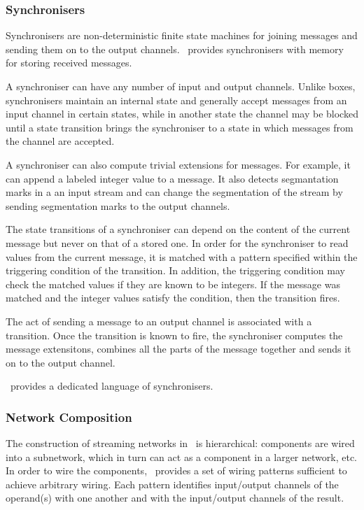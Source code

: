     \subsubsection{Synchronisers}
Synchronisers are non-deterministic finite state machines for joining messages and sending them on to the output channels. \ak\ provides synchronisers with memory for storing received messages.

A synchroniser can have any number of input and output channels. Unlike boxes, synchronisers maintain an internal state and generally accept messages from an input channel in certain states, while in another state the channel may be blocked until a state transition brings the synchroniser to a state in which messages from the channel are accepted.

A synchroniser can also compute trivial extensions for messages. For example, it can append a labeled integer value to a message. It also detects segmantation marks in a an input stream and can change the segmentation of the stream by sending segmentation marks to the output channels.

The state transitions of a synchroniser can depend on the content of the current message but never on that of a stored one. In order for the synchroniser to read values from the current message, it is matched with a pattern specified within the triggering condition of the transition. In addition, the triggering condition may check the matched values if they are known to be integers. If the message was matched and the integer values satisfy the condition, then the transition fires.

The act of sending a message to an output channel is associated with a transition. Once the transition is known to fire, the synchroniser computes the message extensitons, combines all the parts of the message together and sends it on to the output channel.

\ak\ provides a dedicated language of synchronisers.


    \subsubsection{Network Composition}
The construction of streaming networks in \ak\ is hierarchical: components are wired into a subnetwork, which in turn can act as a component in a larger network, etc. In order to wire the components, \ak\ provides a set of wiring patterns sufficient to achieve arbitrary wiring. Each pattern identifies input/output channels of the operand(s) with one another and with the input/output channels of the result.

